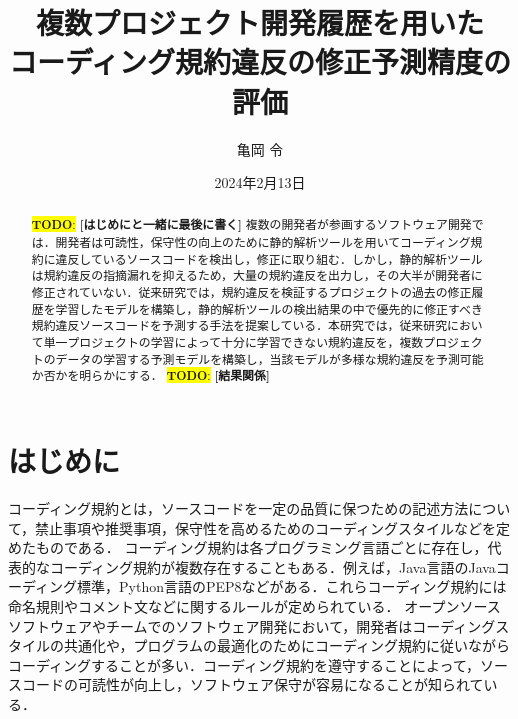 \documentclass[11pt,dvipdfmx]{jreport}
\title{複数プロジェクト開発履歴を用いた\\コーディング規約違反の修正予測精度の評価}
\author{亀岡 令}
\date{2024年2月13日}	%
\newcommand{\todo}[1]{\colorbox{yellow}{{\bf TODO}:}{\color{red} {\textbf{[#1]}}}}
\begin{document}
\maketitle

\begin{abstract}

\todo{はじめにと一緒に最後に書く}
複数の開発者が参画するソフトウェア開発では．開発者は可読性，保守性の向上のために静的解析ツールを用いてコーディング規約に違反しているソースコードを検出し，修正に取り組む．しかし，静的解析ツールは規約違反の指摘漏れを抑えるため，大量の規約違反を出力し，その大半が開発者に修正されていない．従来研究では，規約違反を検証するプロジェクトの過去の修正履歴を学習したモデルを構築し，静的解析ツールの検出結果の中で優先的に修正すべき規約違反ソースコードを予測する手法を提案している．本研究では，従来研究において単一プロジェクトの学習によって十分に学習できない規約違反を，複数プロジェクトのデータの学習する予測モデルを構築し，当該モデルが多様な規約違反を予測可能か否かを明らかにする．
\todo{結果関係}

\end{abstract}

\tableofcontents



\newpage
{}	%




\chapter{はじめに}

コーディング規約とは，ソースコードを一定の品質に保つための記述方法について，禁止事項や推奨事項，保守性を高めるためのコーディングスタイルなどを定めたものである．
コーディング規約は各プログラミング言語ごとに存在し，代表的なコーディング規約が複数存在することもある．例えば，Java言語のJavaコーディング標準，Python言語のPEP8などがある．これらコーディング規約には命名規則やコメント文などに関するルールが定められている．
オープンソースソフトウェアやチームでのソフトウェア開発において，開発者はコーディングスタイルの共通化や，プログラムの最適化のためにコーディング規約に従いながらコーディングすることが多い．コーディング規約を遵守することによって，ソースコードの可読性が向上し，ソフトウェア保守が容易になることが知られている\cite{EffectsSAT}．
\end{document}
